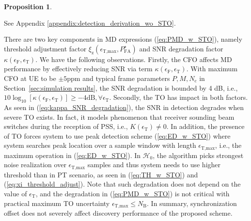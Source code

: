 \documentclass[journal]{IEEEtran}
\newtheorem{proposition}{Proposition}
\newcommand{\CFO}[0]{\epsilon_{\text{F}}}
\newcommand{\STO}[0]{\epsilon_{\text{T}}}
\newcommand{\Nb}[0]{N_{\text{B}}}
\newcommand{\Nc}[0]{N_{\text{c}}}
\begin{document}
\begin{proposition}
\end{proposition}
\begin{IEEEproof}
See Appendix \ref{appendix:detection_derivation_wo_STO}.
\end{IEEEproof}

There are two key components in MD expressions (\ref{eq:PMD_w_STO}), namely threshold adjustment factor $\xi_{\text{z}}(\epsilon_{\text{T,max}},P^{\star}_{\text{FA}})$ and SNR degradation factor $\kappa(\CFO,\STO)$. We have the following observations. Firstly, the CFO affects MD performance by effectively reducing SNR via term $\kappa(\CFO,\STO)$. With maximum CFO at UE to be $\pm 5$ppm and typical frame parameters $P,M,\Nc$ in Section~\ref{sec:simulation results}, the SNR degradation is bounded by 4 dB, i.e., $10\log_{10}[\kappa(\CFO,\STO)]\geq-4\text{dB},\forall \STO$. 
Secondly, the TO has impact in both factors. As seen in (\ref{eq:kappa_SNR_degradation}), the SNR in detection degrades when severe TO exists. In fact, it models phenomenon that receiver sounding beam switches during the reception of PSS, i.e., $K(\STO)\neq 0$. In addition, the presence of TO forces system to use peak detection scheme (\ref{eq:ED_w_STO}) where system searches peak location over a sample window with length $\epsilon_{\text{T,max}}$, i.e., the maximum operation in (\ref{eq:ED_w_STO}). In $\mathcal{H}_0$, the algorithm picks strongest noise realization over $\epsilon_{\text{T,max}}$ samples and thus system needs to use higher threshold than in PT scenario, as seen in (\ref{eq:TH_w_STO}) and (\ref{eq:xi_threshold_adjust}). Note that such degradation does not depend on the value of $\STO$, and the degradation in (\ref{eq:PMD_w_STO}) is not critical with practical maximum TO uncertainty $\epsilon_{\text{T,max}}\leq \Nb$. In summary, synchronization offset does not severely affect discovery performance of the proposed scheme.
% 
%

\end{document}
